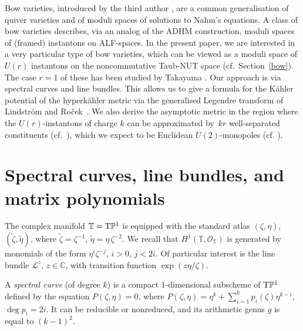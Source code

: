 \documentclass[pdftex]{sigma}
\newcommand{\cx}{{\mathbb C}}
\numberwithin{equation}{section}
\newcommand{\oP}{{\mathbb{P}}}
\newcommand{\oT}{{\mathbb{T}}}
\newcommand{\sO}{{\mathcal{O}}}
\begin{document}
\renewcommand{\thefootnote}{\arabic{footnote}}
\setcounter{footnote}{0}


Bow varieties, introduced by the third author \cite{Che1,Che2}, are a common generalisation of quiver varieties and of moduli spaces of solutions to Nahm's equations.
A class of bow varieties describes, via an analog of the ADHM construction, moduli spaces of (framed) instantons on ALF-spaces.
In the present paper, we are interested in a very particular type of bow varieties, which can be viewed as a moduli space of $U(r)$ instantons on the {noncommutative} Taub-NUT space (cf.~Section~\ref{bow}). The case $r=1$ of these has been studied by Takayama
 \cite{Tak}. Our approach is via spectral curves and line bundles.
 This allows us to give a formula for the K\"ahler potential of the hyperk\"ahler metric via the generalised Legendre transform of Lindstr\"om and Ro\v{c}ek~\cite{LR}.
 We also derive the asymptotic metric in the region where the $U(r)$-instantons of charge $k$ can be approximated by~$kr$ well-separated constituents (cf.\ \cite[Section~9]{Che2}), which we expect to be Euclidean $U(2)$-monopoles (cf. \cite{FR}).

\section{Spectral curves, line bundles, and matrix polynomials}

The complex manifold $\oT={\rm T}\oP^1$ is equipped with the standard atlas $(\zeta,\eta)$, $(\tilde \zeta,\tilde\eta)$, where $\tilde\zeta=\zeta^{-1}$, $\tilde\eta=\eta\,\zeta^{-2}$. We recall \cite[Proposition~2.2]{AHH} that $H^1(\oT,\sO_\oT)$ is generated by monomials of the form $\eta^i\zeta^{-j}$, $i>0$, $j<2i$. Of particular interest is the line bundle $\mathscr{L}^z$, $z\in\cx$, with transition function $\exp(z\eta/\zeta)$.

A {\em spectral curve} (of degree $k$) is a compact $1$-dimensional subscheme of ${\rm T}\oP^1$ defined by the equation $P(\zeta,\eta)=0$, where $P(\zeta,\eta)=\eta^k+\sum_{i=1}^kp_i(\zeta)\eta^{k-i}$, $\deg p_i=2i$. It can be reducible or nonreduced, and its arithmetic genus $g$ is equal to $(k-1)^2$.
\end{document}
